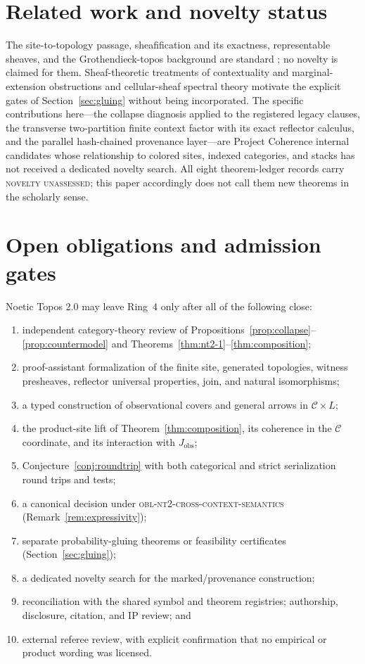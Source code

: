\documentclass[11pt]{amsart}
\theoremstyle{definition}
\theoremstyle{remark}
\newcommand{\cC}{\mathcal{C}}
\begin{document}
\section{Related work and novelty status}\label{sec:related}

The site-to-topology passage, sheafification and its exactness, representable sheaves, and the Grothendieck-topos background are standard \cite{maclane,stacks00ZC,stacks00W1,stacks00WO}; no novelty is claimed for them. Sheaf-theoretic treatments of contextuality and marginal-extension obstructions \cite{abramskybrandenburger} and cellular-sheaf spectral theory \cite{hansenghrist} motivate the explicit gates of Section~\ref{sec:gluing} without being incorporated. The specific contributions here---the collapse diagnosis applied to the registered legacy clauses, the transverse two-partition finite context factor with its exact reflector calculus, and the parallel hash-chained provenance layer---are Project Coherence internal candidates whose relationship to colored sites, indexed categories, and stacks has not received a dedicated novelty search. All eight theorem-ledger records carry \textsc{novelty unassessed}; this paper accordingly does not call them new theorems in the scholarly sense.

\section{Open obligations and admission gates}\label{sec:gates}

Noetic Topos 2.0 may leave Ring~4 only after all of the following close:
\begin{enumerate}
\item independent category-theory review of Propositions~\ref{prop:collapse}--\ref{prop:countermodel} and Theorems~\ref{thm:nt2-1}--\ref{thm:composition};
\item proof-assistant formalization of the finite site, generated topologies, witness presheaves, reflector universal properties, join, and natural isomorphisms;
\item a typed construction of observational covers and general arrows in $\cC\times L$;
\item the product-site lift of Theorem~\ref{thm:composition}, its coherence in the $\cC$ coordinate, and its interaction with $J_{\mathrm{obs}}$;
\item Conjecture~\ref{conj:roundtrip} with both categorical and strict serialization round trips and tests;
\item a canonical decision under \textsc{obl-nt2-cross-context-semantics} (Remark~\ref{rem:expressivity});
\item separate probability-gluing theorems or feasibility certificates (Section~\ref{sec:gluing});
\item a dedicated novelty search for the marked/provenance construction;
\item reconciliation with the shared symbol and theorem registries; authorship, disclosure, citation, and IP review; and
\item external referee review, with explicit confirmation that no empirical or product wording was licensed.
\end{enumerate}
\end{document}
